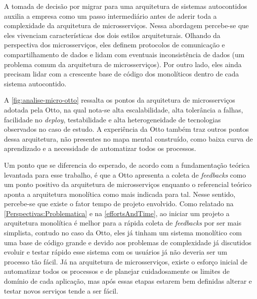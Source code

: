 A tomada de decisão por migrar para uma arquitetura de sistemas autocontidos auxilia a empresa como um
passo intermediário antes de aderir toda a complexidade da arquitetura de microsserviços. Nessa
abordagem percebe-se que eles vivenciam características dos dois estilos arquiteturais. Olhando da
perspectiva dos microsserviços, eles definem protocolos de comunicação e compartilhamento de dados e lidam
com eventuais inconsistência de dados (um problema comum da arquitetura de microsserviços). Por
outro lado, eles ainda precisam lidar com a crescente base de código dos monolíticos dentro de cada
sistema autocontido.

A \autoref{fig:analise-micro-otto} ressalta os pontos da arquitetura de microsserviços
adotada pela Otto, na qual nota-se alta escalabilidade, alta tolerância a falhas, facilidade no
\textit{deploy}, testabilidade e alta heterogeneidade de tecnologias observados no caso de estudo.
A experiência da Otto também traz outros pontos dessa arquitetura, não presentes no mapa mental
construído, como baixa curva de aprendizado e a necessidade de automatizar todos os processos.  

Um ponto que se diferencia do esperado, de acordo com a fundamentação teórica levantada para esse
trabalho, é que a Otto apresenta a coleta de \textit{feedbacks} como um ponto positivo da
arquitetura de microsserviços enquanto o referencial teórico aponta a arquitetura monolítica como
mais indicada para tal. Nesse sentido, percebe-se que existe o fator tempo de projeto envolvido.
Como relatado na \autoref{Perspectivas:Problematica} e na \autoref{effortsAndTime}, ao iniciar um
projeto a arquitetura monolítica é melhor para a rápida coleta de \textit{feedbacks} por ser mais
simplista, contudo no caso da Otto, eles já tinham um sistema monolítico com uma base de código
grande e devido aos problemas de complexidade já discutidos evoluir e testar rápido esse sistema com
os usuários já não deveria ser um processo tão fácil. Já na arquitetura de microsserviços, existe o
esforço inicial de automatizar todos os processos e de planejar cuidadosamente os limites de domínio
de cada aplicação, mas após essas etapas estarem bem definidas alterar e testar novos serviços tende
a ser fácil.

